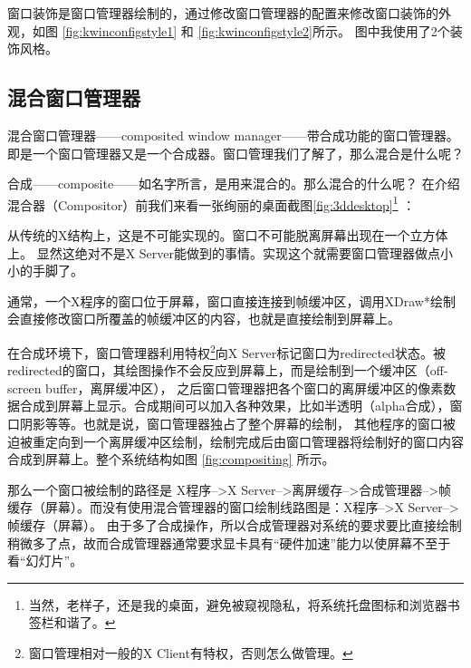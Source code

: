 
窗口装饰是窗口管理器绘制的，通过修改窗口管理器的配置来修改窗口装饰的外观，如图 \ref{fig:kwinconfigstyle1} 和 \ref{fig:kwinconfigstyle2}所示。
图中我使用了2个装饰风格。



\subsection{混合窗口管理器}

混合窗口管理器——composited window manager——带合成功能的窗口管理器。
即是一个窗口管理器又是一个合成器。窗口管理我们了解了，那么混合是什么呢？

合成——composite——如名字所言，是用来混合的。那么混合的什么呢？
在介绍混合器（Compositor）前我们来看一张绚丽的桌面截图\ref{fig:3ddesktop}\footnote{当然，老样子，还是我的桌面，避免被窥视隐私，将系统托盘图标和浏览器书签栏和谐了。} ：


从传统的X结构上，这是不可能实现的。窗口不可能脱离屏幕出现在一个立方体上。
显然这绝对不是X Server能做到的事情。实现这个就需要窗口管理器做点小小的手脚了。

通常，一个X程序的窗口位于屏幕，窗口直接连接到帧缓冲区，调用XDraw*绘制会直接修改窗口所覆盖的帧缓冲区的内容，也就是直接绘制到屏幕上。

在合成环境下，窗口管理器利用特权\footnote{窗口管理相对一般的X Client有特权，否则怎么做管理。}向X Server标记窗口为redirected状态。被redirected的窗口，其绘图操作不会反应到屏幕上，而是绘制到一个缓冲区（off-screen buffer，离屏缓冲区）， 之后窗口管理器把各个窗口的离屏缓冲区的像素数据合成到屏幕上显示。合成期间可以加入各种效果，比如半透明（alpha合成），窗口阴影等等。也就是说，窗口管理器独占了整个屏幕的绘制，
其他程序的窗口被迫被重定向到一个离屏缓冲区绘制，绘制完成后由窗口管理器将绘制好的窗口内容合成到屏幕上。整个系统结构如图 \ref{fig:compositing} 所示。


那么一个窗口被绘制的路径是 X程序-->X Server-->离屏缓存-->合成管理器-->帧缓存（屏幕）。而没有使用混合管理器的窗口绘制线路图是：X程序-->X Server-->帧缓存（屏幕）。
由于多了合成操作，所以合成管理器对系统的要求要比直接绘制稍微多了点，故而合成管理器通常要求显卡具有“硬件加速”能力以使屏幕不至于看“幻灯片”。

